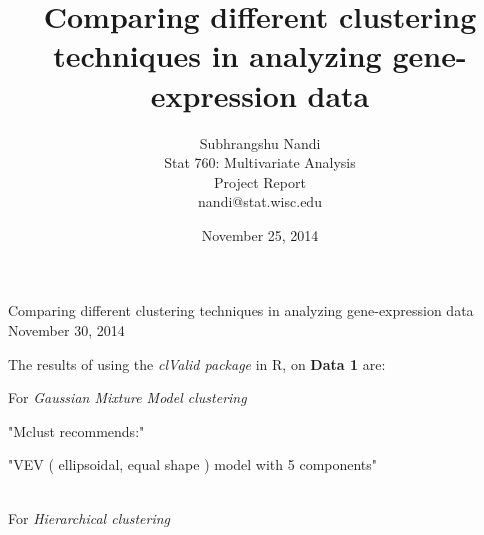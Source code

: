 \documentclass[11p]{article}
\begin{document}



\title{Comparing different clustering techniques in analyzing gene-expression data}
\author{Subhrangshu Nandi\\
  Stat 760: Multivariate Analysis\\
  Project Report \\
  nandi@stat.wisc.edu}
\date{November 25, 2014}


\begin{center}
{\Large{Comparing different clustering techniques in analyzing gene-expression data}}\\
November 30, 2014
\end{center}

\noindent
The results of using the {\emph{clValid package}} in R, on {\bf{Data 1}} are:

For {\emph{Gaussian Mixture Model clustering}}\\
\begin{Schunk}
\begin{Soutput}
[1] "Mclust recommends:"
\end{Soutput}
\begin{Soutput}
[1] "VEV ( ellipsoidal, equal shape ) model with 5 components"
\end{Soutput}
\end{Schunk}
\\
For {\emph{Hierarchical clustering}}\\
\end{document}

